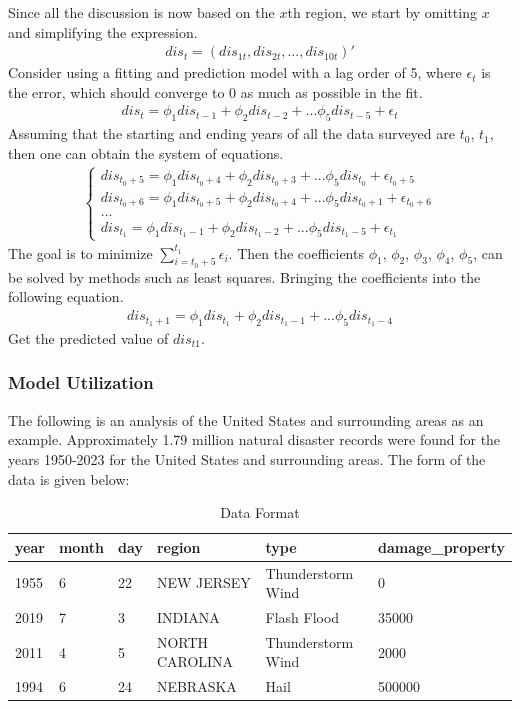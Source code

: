 \documentclass[12pt]{article}  %
\begin{document}
Since all the discussion is now based on the $x$th region, we start by omitting $x$ and simplifying the expression.
\begin{align*}
dis_{t}=(dis_{1t},dis_{2t},...,dis_{10t})'
\end{align*}
Consider using a fitting and prediction model with a lag order of 5, where $\epsilon_t$ is the error, which should converge to 0 as much as possible in the fit.
\begin{align*}
dis_{t}=\phi_{1}dis_{t-1}+\phi_{2}dis_{t-2}+...\phi_{5}dis_{t-5}+\epsilon_{t}
\end{align*}
Assuming that the starting and ending years of all the data surveyed are $t_0$, $t_1$, then one can obtain the system of equations.
\begin{align*}
\begin{cases}
dis_{t_0+5}=\phi_{1}dis_{t_0+4}+\phi_{2}dis_{t_0+3}+...\phi_{5}dis_{t_0}+\epsilon_{t_0+5}
\\
dis_{t_0+6}=\phi_{1}dis_{t_0+5}+\phi_{2}dis_{t_0+4}+...\phi_{5}dis_{t_0+1}+\epsilon_{t_0+6}
\\
...
\\
dis_{t_1}=\phi_{1}dis_{t_1-1}+\phi_{2}dis_{t_1-2}+...\phi_{5}dis_{t_1-5}+\epsilon_{t_1}
\end{cases} 
\end{align*}
The goal is to minimize $\sum\limits_{i=t_0+5}^{t_1} \epsilon_i$. Then the coefficients $\phi_1$, $\phi_2$, $\phi_3$, $\phi_4$, $\phi_5$, can be solved by methods such as least squares.
Bringing the coefficients into the following equation.
\begin{align*}
dis_{t_1+1}=\phi_{1}dis_{t_1}+\phi_{2}dis_{t_1-1}+...\phi_{5}dis_{t_1-4}
\end{align*}
Get the predicted value of $dis_{t1}$.

\subsubsection{Model Utilization}

The following is an analysis of the United States and surrounding areas as an example.
Approximately 1.79 million natural disaster records were found for the years 1950-2023 for the United States and surrounding areas. The form of the data is given below:


\begin{table}[!ht]
    \centering
    \caption{Data Format}
    \begin{tabular}{|l|l|l|l|l|l|}
    \hline
        year & month & day & region & type & damage\_property \\ \hline
        1955 & 6 & 22 & NEW JERSEY & Thunderstorm Wind & 0 \\ \hline
        2019 & 7 & 3 & INDIANA & Flash Flood & 35000 \\ \hline
        2011 & 4 & 5 & NORTH CAROLINA & Thunderstorm Wind & 2000 \\ \hline
        1994 & 6 & 24 & NEBRASKA & Hail & 500000 \\ \hline
    \end{tabular}
\end{table}
\end{document}
